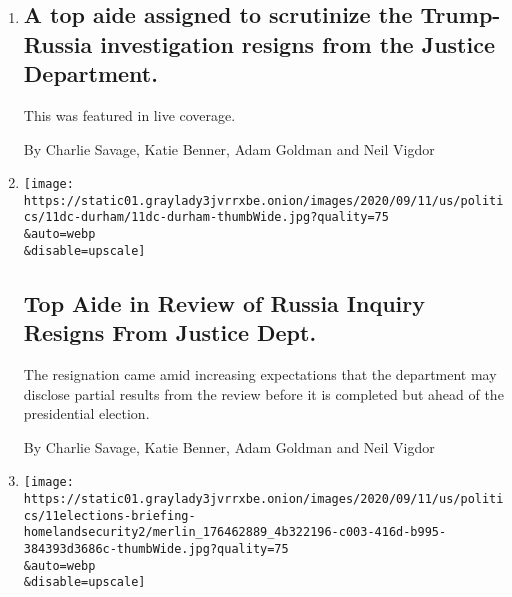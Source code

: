\begin{enumerate}
\def\labelenumi{\arabic{enumi}.}
\item
  \href{/live/2020/09/11/us/trump-vs-biden/a-top-aide-assigned-to-scrutinize-the-trump-russia-investigation-resigns-from-the-justice-department}{}

  \hypertarget{a-top-aide-assigned-to-scrutinize-the-trump-russia-investigation-resigns-from-the-justice-department}{%
  \subsection{A top aide assigned to scrutinize the Trump-Russia
  investigation resigns from the Justice
  Department.}\label{a-top-aide-assigned-to-scrutinize-the-trump-russia-investigation-resigns-from-the-justice-department}}

  This was featured in live coverage.

  By Charlie Savage, Katie Benner, Adam Goldman and Neil Vigdor
\item
  \href{/2020/09/11/us/politics/nora-dannehy-durham-russia-investigation.html}{}

  \texttt{[image: https://static01.graylady3jvrrxbe.onion/images/2020/09/11/us/politics/11dc-durham/11dc-durham-thumbWide.jpg?quality=75\\\&auto=webp\\\&disable=upscale]}

  \hypertarget{top-aide-in-review-of-russia-inquiry-resigns-from-justice-dept}{%
  \subsection{Top Aide in Review of Russia Inquiry Resigns From Justice
  Dept.}\label{top-aide-in-review-of-russia-inquiry-resigns-from-justice-dept}}

  The resignation came amid increasing expectations that the department
  may disclose partial results from the review before it is completed
  but ahead of the presidential election.

  By Charlie Savage, Katie Benner, Adam Goldman and Neil Vigdor
\item
  \href{/live/2020/09/11/us/trump-vs-biden/the-department-of-homeland-security-formed-after-9-11-is-accused-of-distorting-intelligence-to-please-trump}{}

  \texttt{[image: https://static01.graylady3jvrrxbe.onion/images/2020/09/11/us/politics/11elections-briefing-homelandsecurity2/merlin\_176462889\_4b322196-c003-416d-b995-384393d3686c-thumbWide.jpg?quality=75\\\&auto=webp\\\&disable=upscale]}


\end{enumerate}
